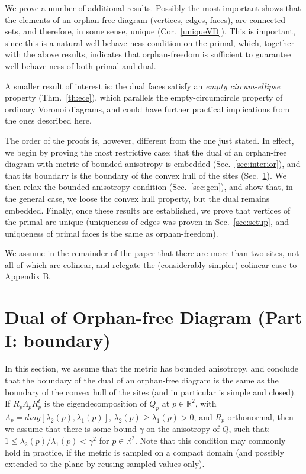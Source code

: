 \documentclass[11pt]{article}
\begin{document}
We prove a number of additional results. Possibly the most important shows that the elements of an orphan-free diagram (vertices, edges, faces), 
are connected sets, and therefore, in some sense, unique (Cor.~\ref{uniqueVD}). 
This is important, since this is a natural well-behave-ness condition on the primal, which, together 
with the above results, indicates that orphan-freedom is sufficient to guarantee well-behave-ness of both primal and dual. 

A smaller result of interest is: the dual faces satisfy an \emph{empty circum-ellipse} property (Thm.~\ref{th:ece}), which parallels the empty-circumcircle property of ordinary Voronoi diagrams, 
and could have further practical implications from the ones described here. 

The order of the proofs is, however, different from the one just stated. In effect, we begin by proving the most restrictive case: that the dual of an orphan-free diagram with metric of bounded anisotropy is embedded (Sec.~\ref{sec:interior}), 
and that its boundary is the boundary of the convex hull of the sites (Sec.~\ref{sec:boundary}). We then relax the bounded anisotropy condition (Sec.~\ref{sec:gen}), and show that, in the general case, we loose the convex hull property, but the dual remains embedded. 
Finally, once these results are established, we prove that vertices of the primal are unique (uniqueness of edges was proven in Sec.~\ref{sec:setup}, and uniqueness of primal faces is the same as orphan-freedom). 

We assume in the remainder of the paper that there are more than two sites, not all of which are colinear, and relegate the (considerably simpler) colinear case to Appendix B. 











\section{Dual of Orphan-free Diagram (Part I: boundary)}\label{sec:boundary}

In this section, we assume that the metric has bounded anisotropy, and conclude that the boundary of the dual of an orphan-free diagram is the same as the boundary of the convex hull of the sites (and in particular is simple and closed). 
If $R_p\Lambda_p R_p^t$ is the eigendecomposition of $Q_p$ at $p\in\mathbb{R}^2$, with $\Lambda_p = diag[\lambda_2(p),\lambda_1(p)]$, $\lambda_2(p)\ge\lambda_1(p)>0$, and $R_p$ orthonormal, then we assume that there is some bound $\gamma$ on the anisotropy of $Q$, such that: $1\le \lambda_2(p)/\lambda_1(p) < \gamma^2$ for $p\in\mathbb{R}^2$. 
Note that this condition may commonly hold in practice, if the metric is sampled on a compact domain (and possibly extended to the plane by reusing sampled values only). 
\end{document}

